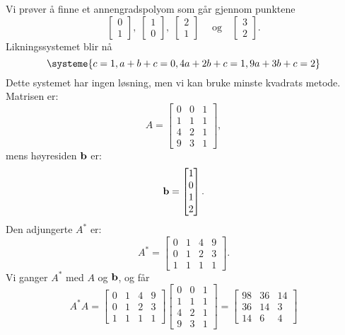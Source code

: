 \begin{ex}
Vi prøver å finne et annengradspolyom som går gjennom punktene
\[
\begin{bmatrix}
0 \\ 1
\end{bmatrix}, \;
\begin{bmatrix}
1 \\ 0
\end{bmatrix}, \;
\begin{bmatrix}
2 \\ 1
\end{bmatrix} \;
\quad \text{og} \quad
\begin{bmatrix}
3 \\ 2
\end{bmatrix} .
\]
Likningssystemet blir nå
\[
\systeme{
                   c = 1,
    a + b + c  = 0,
    4a + 2b + c = 1,
    9a + 3b + c = 2
}
\]
Dette systemet har ingen løsning, men vi kan bruke minste kvadrats metode. Matrisen er:
\[
A=
\begin{bmatrix}
0 & 0 & 1 \\  1&1 &1 \\ 4& 2&1 \\ 9& 3& 1
\end{bmatrix}, 
\]
mens høyresiden $\mathbf{b}$ er:
\[
\mathbf{b}=
\begin{bmatrix}
1 \\ 0 \\ 1 \\ 2
\end{bmatrix}.
\]
Den adjungerte $A^*$ er:
\[
A^*=
\begin{bmatrix}
0 & 1 & 4 & 9\\  0&1 &2 & 3\\ 1& 1&1 &1 
\end{bmatrix}.
\]
Vi ganger $A^*$ med $A$ og $\mathbf{b}$, og får 
\[
A^*A=
\begin{bmatrix}
0 & 1 & 4 & 9\\  0&1 &2 & 3\\ 1& 1&1 &1 
\end{bmatrix}
\begin{bmatrix}
0 & 0 & 1 \\  1&1 &1 \\ 4& 2&1 \\ 9& 3& 1
\end{bmatrix} 
=
\begin{bmatrix}
98 & 36 & 14 \\  36 &14 & 3\\ 14& 6&4
\end{bmatrix}
\]
\end{ex}
